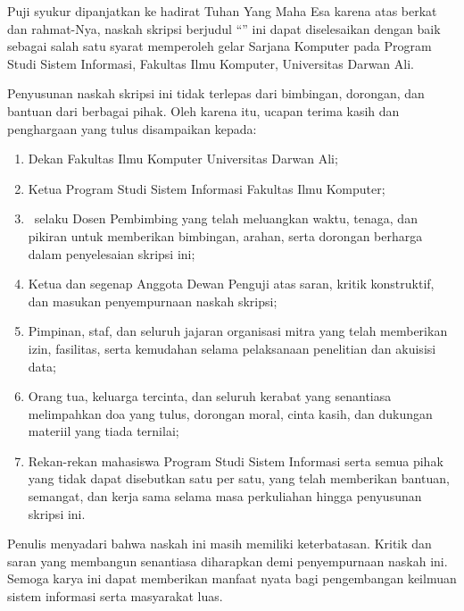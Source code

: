 \begin{katapengantar}

Puji syukur dipanjatkan ke hadirat Tuhan Yang Maha Esa karena atas berkat dan rahmat-Nya,
naskah skripsi berjudul \enquote{\judulskripsi} ini dapat diselesaikan dengan baik sebagai
salah satu syarat memperoleh gelar Sarjana Komputer pada Program Studi Sistem Informasi,
Fakultas Ilmu Komputer, Universitas Darwan Ali.

Penyusunan naskah skripsi ini tidak terlepas dari bimbingan, dorongan, dan bantuan dari
berbagai pihak. Oleh karena itu, ucapan terima kasih dan penghargaan yang tulus disampaikan kepada:
\begin{enumerate}
  \item Dekan Fakultas Ilmu Komputer Universitas Darwan Ali;
  \item Ketua Program Studi Sistem Informasi Fakultas Ilmu Komputer;
  \item \dosendpembimbing\ selaku Dosen Pembimbing yang telah meluangkan waktu, tenaga, dan pikiran untuk memberikan bimbingan, arahan, serta dorongan berharga dalam penyelesaian skripsi ini;
  \item Ketua dan segenap Anggota Dewan Penguji atas saran, kritik konstruktif, dan masukan penyempurnaan naskah skripsi;
  \item Pimpinan, staf, dan seluruh jajaran organisasi mitra yang telah memberikan izin, fasilitas, serta kemudahan selama pelaksanaan penelitian dan akuisisi data;
  \item Orang tua, keluarga tercinta, dan seluruh kerabat yang senantiasa melimpahkan doa yang tulus, dorongan moral, cinta kasih, dan dukungan materiil yang tiada ternilai;
  \item Rekan-rekan mahasiswa Program Studi Sistem Informasi serta semua pihak yang tidak dapat disebutkan satu per satu, yang telah memberikan bantuan, semangat, dan kerja sama selama masa perkuliahan hingga penyusunan skripsi ini.
\end{enumerate}

Penulis menyadari bahwa naskah ini masih memiliki keterbatasan. Kritik dan saran yang membangun
senantiasa diharapkan demi penyempurnaan naskah ini. Semoga karya ini dapat memberikan manfaat
nyata bagi pengembangan keilmuan sistem informasi serta masyarakat luas.
\end{katapengantar}
